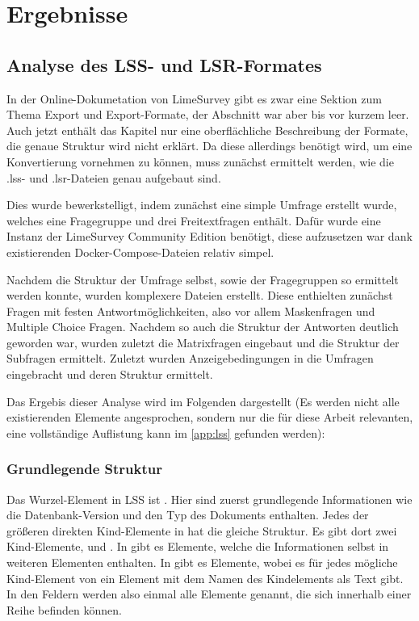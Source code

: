 \chapter{Ergebnisse}
\label{ch:ergebnisse}

\section{Analyse des LSS- und LSR-Formates}

In der Online-Dokumetation von LimeSurvey gibt es zwar eine Sektion zum Thema Export und Export-Formate, der Abschnitt war aber bis vor kurzem leer.
Auch jetzt enthält das Kapitel nur eine oberflächliche Beschreibung der Formate, die genaue Struktur wird nicht erklärt.
Da diese allerdings benötigt wird, um eine Konvertierung vornehmen zu können, muss zunächst ermittelt werden, wie die .lss- und .lsr-Dateien genau aufgebaut sind.

Dies wurde bewerkstelligt, indem zunächst eine simple Umfrage erstellt wurde, welches eine Fragegruppe und drei Freitextfragen enthält.
Dafür wurde eine Instanz der LimeSurvey Community Edition benötigt, diese aufzusetzen war dank existierenden Docker-Compose-Dateien relativ simpel.

Nachdem die Struktur der Umfrage selbst, sowie der Fragegruppen so ermittelt werden konnte, wurden komplexere Dateien erstellt.
Diese enthielten zunächst Fragen mit festen Antwortmöglichkeiten, also vor allem Maskenfragen und Multiple Choice Fragen.
Nachdem so auch die Struktur der Antworten deutlich geworden war, wurden zuletzt die Matrixfragen eingebaut und die Struktur der Subfragen ermittelt.
Zuletzt wurden Anzeigebedingungen in die Umfragen eingebracht und deren Struktur ermittelt.

Das Ergebis dieser Analyse wird im Folgenden dargestellt (Es werden nicht alle existierenden Elemente angesprochen, sondern nur die für diese Arbeit relevanten, eine vollständige Auflistung kann im \cref{app:lss} gefunden werden):

\subsection{Grundlegende Struktur}

Das Wurzel-Element in LSS ist .
Hier sind zuerst grundlegende Informationen wie die Datenbank-Version und den Typ des Dokuments enthalten.
Jedes der größeren direkten Kind-Elemente in  hat die gleiche Struktur.
Es gibt dort zwei Kind-Elemente,  und . In  gibt es  Elemente, welche die Informationen selbst in weiteren Elementen enthalten.
In  gibt es  Elemente, wobei es für jedes mögliche Kind-Element von  ein  Element mit dem Namen des Kindelements als Text gibt.
In den Feldern werden also einmal alle Elemente genannt, die sich innerhalb einer Reihe befinden können.


